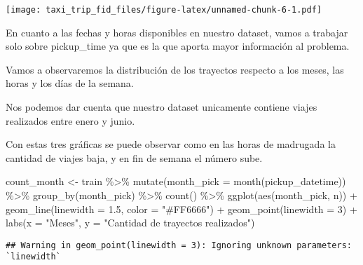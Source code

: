 \documentclass[
]{article}
\newenvironment{Shaded}{\begin{snugshade}}{\end{snugshade}}
\newcommand{\AttributeTok}[1]{\textcolor[rgb]{0.77,0.63,0.00}{#1}}
\newcommand{\DecValTok}[1]{\textcolor[rgb]{0.00,0.00,0.81}{#1}}
\newcommand{\FloatTok}[1]{\textcolor[rgb]{0.00,0.00,0.81}{#1}}
\newcommand{\FunctionTok}[1]{\textcolor[rgb]{0.00,0.00,0.00}{#1}}
\newcommand{\NormalTok}[1]{#1}
\newcommand{\OtherTok}[1]{\textcolor[rgb]{0.56,0.35,0.01}{#1}}
\newcommand{\SpecialCharTok}[1]{\textcolor[rgb]{0.00,0.00,0.00}{#1}}
\newcommand{\StringTok}[1]{\textcolor[rgb]{0.31,0.60,0.02}{#1}}
\begin{document}
\texttt{[image: taxi\_trip\_fid\_files/figure-latex/unnamed-chunk-6-1.pdf]}

En cuanto a las fechas y horas disponibles en nuestro dataset, vamos a
trabajar solo sobre pickup\_time ya que es la que aporta mayor
información al problema.

Vamos a observaremos la distribución de los trayectos respecto a los
meses, las horas y los días de la semana.

Nos podemos dar cuenta que nuestro dataset unicamente contiene viajes
realizados entre enero y junio.

Con estas tres gráficas se puede observar como en las horas de madrugada
la cantidad de viajes baja, y en fin de semana el número sube.

\begin{Shaded}
\begin{Highlighting}[]
\NormalTok{count\_month }\OtherTok{\textless{}{-}}\NormalTok{ train }\SpecialCharTok{\%\textgreater{}\%}
  \FunctionTok{mutate}\NormalTok{(}\AttributeTok{month\_pick =} \FunctionTok{month}\NormalTok{(pickup\_datetime)) }\SpecialCharTok{\%\textgreater{}\%}
  \FunctionTok{group\_by}\NormalTok{(month\_pick) }\SpecialCharTok{\%\textgreater{}\%}
  \FunctionTok{count}\NormalTok{() }\SpecialCharTok{\%\textgreater{}\%}
  \FunctionTok{ggplot}\NormalTok{(}\FunctionTok{aes}\NormalTok{(month\_pick, n)) }\SpecialCharTok{+}
  \FunctionTok{geom\_line}\NormalTok{(}\AttributeTok{linewidth =} \FloatTok{1.5}\NormalTok{, }\AttributeTok{color =} \StringTok{"\#FF6666"}\NormalTok{) }\SpecialCharTok{+}
  \FunctionTok{geom\_point}\NormalTok{(}\AttributeTok{linewidth =} \DecValTok{3}\NormalTok{) }\SpecialCharTok{+} 
  \FunctionTok{labs}\NormalTok{(}\AttributeTok{x =} \StringTok{"Meses"}\NormalTok{, }\AttributeTok{y =} \StringTok{"Cantidad de trayectos realizados"}\NormalTok{)}
\end{Highlighting}
\end{Shaded}

\begin{verbatim}
## Warning in geom_point(linewidth = 3): Ignoring unknown parameters: `linewidth`
\end{verbatim}
\end{document}
